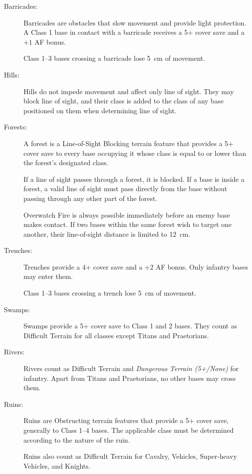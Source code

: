 \begin{description}
    \item[Barricades:] Barricades are obstacles that slow movement and provide light protection. A Class 1 base in contact with a barricade receives a 5+ cover save and a $+1$ AF bonus.

    Class 1--3 bases crossing a barricade lose 5~cm of movement.

    \item[Hills:] Hills do not impede movement and affect only line of sight. They may block line of sight, and their class is added to the class of any base positioned on them when determining line of sight.

    \item[Forests:] A forest is a Line-of-Sight Blocking terrain feature that provides a 5+ cover save to every base occupying it whose class is equal to or lower than the forest's designated class.

    If a line of sight passes through a forest, it is blocked. If a base is inside a forest, a valid line of sight must pass directly from the base without passing through any other part of the forest.

    Overwatch Fire is always possible immediately before an enemy base makes contact. If two bases within the same forest wish to target one another, their line-of-sight distance is limited to 12~cm.

    \item[Trenches:] Trenches provide a 4+ cover save and a $+2$ AF bonus. Only infantry bases may enter them.

    Class 1--3 bases crossing a trench lose 5~cm of movement.

    \item[Swamps:] Swamps provide a 5+ cover save to Class 1 and 2 bases. They count as Difficult Terrain for all classes except Titans and Praetorians.

    \item[Rivers:] Rivers count as Difficult Terrain and \textit{Dangerous Terrain (5+/None)} for infantry. Apart from Titans and Praetorians, no other bases may cross them.

    \item[Ruins:] Ruins are Obstructing terrain features that provide a 5+ cover save, generally to Class 1--4 bases. The applicable class must be determined according to the nature of the ruin.

    Ruins also count as Difficult Terrain for Cavalry, Vehicles, Super-heavy Vehicles, and Knights.


\end{description}
